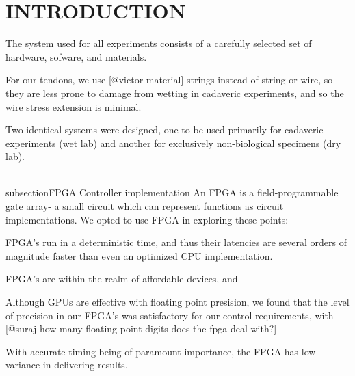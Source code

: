 \section{INTRODUCTION}

 The system used for all experiments consists of a carefully selected set of hardware, sofware, and materials.

For our tendons, we use [@victor material] strings instead of string or wire, so they are less prone to damage from wetting in cadaveric experiments, and so the wire stress extension is minimal.

 Two identical systems were designed, one to be used primarily for cadaveric experiments (wet lab) and another for exclusively non-biological specimens (dry lab).

\\subsection{FPGA Controller implementation} %
\label{sub:fpga_controller_implementation}
An FPGA is a field-programmable gate array- a small circuit which can represent functions as circuit implementations.
We opted to use FPGA in exploring these points:
\item FPGA's run in a deterministic time, and thus their latencies are several orders of magnitude faster than even an optimized CPU implementation.
\item FPGA's are within the realm of affordable devices, and 
\item Although GPUs are effective with floating point presision, we found that the level of precision in our FPGA's was satisfactory for our control requirements, with [@suraj how many floating point digits does the fpga deal with?]
\item With accurate timing being of paramount importance, the FPGA has low-variance in delivering results.



